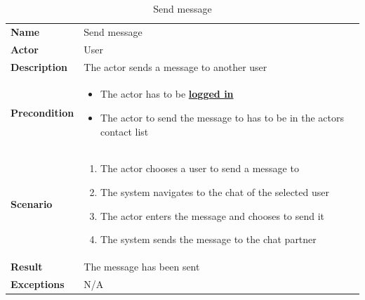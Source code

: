 \begin{table}[ht]
    \caption{Send message}
    \begin{tabular}{|L{5cm}|L{10cm}|}
        \toprule
        \textbf{Name}        & Send message                              \\
        \textbf{Actor}       & User                                      \\
        \textbf{Description} & The actor sends a message to another user \\
        \textbf{Precondition} &
        \vspace{-0.75cm}
        \begin{itemize}
            \setlength\itemsep{-0.5em}
            \item The actor has to be \textbf{\hyperref[tab:table8]{logged in}}
            \item The actor to send the message to has to be in the actors contact list
        \end{itemize} \\[-0.5cm]
        \textbf{Scenario} &
        \vspace{-0.75cm}
        \begin{enumerate}
            \setlength\itemsep{-0.5em}
            \item The actor chooses a user to send a message to
            \item The system navigates to the chat of the selected user
            \item The actor enters the message and chooses to send it
            \item The system sends the message to the chat partner
        \end{enumerate} \\[-0.5cm]
        \textbf{Result}      & The message has been sent                 \\
        \textbf{Exceptions}  & N/A                                       \\
        \bottomrule
    \end{tabular}
    \label{tab:table9}
\end{table}

